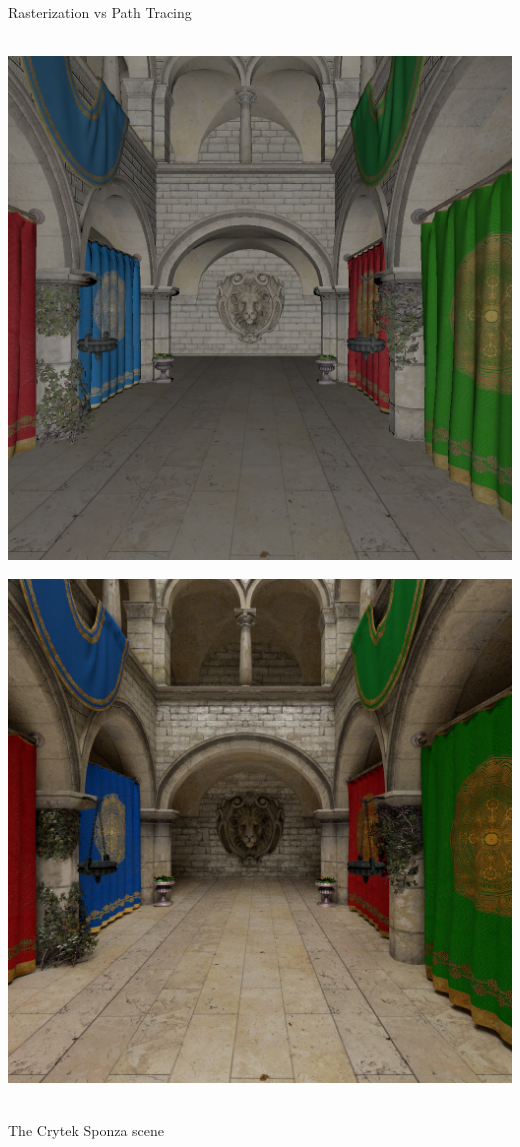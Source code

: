 \documentclass[utf8,stillsansserifmath,fleqn,t]{beamer}
\begin{document}
\begin{frame}
\frametitle{\insertsection}
Rasterization vs Path Tracing\\~\\
\begin{minipage}{.48\textwidth}
\includegraphics[width=\textwidth]{./fig/sponza-rasterization.png}
\end{minipage}\hfill
\begin{minipage}{.48\textwidth}
\includegraphics[width=\textwidth]{./fig/sponza-pathtracing.png}
\end{minipage}\\\vfill
The Crytek Sponza scene
\end{frame}
\end{document}
